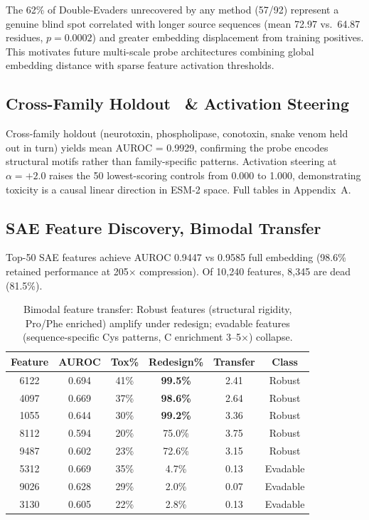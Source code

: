 \documentclass[11pt,a4paper]{article}
\begin{document}
The 62\% of Double-Evaders unrecovered by any method (57/92) represent a genuine blind spot correlated with longer source sequences (mean 72.97 vs.\ 64.87 residues, $p=0.0002$) and greater embedding displacement from training positives. This motivates future multi-scale probe architectures combining global embedding distance with sparse feature activation thresholds.

\subsection{Cross-Family Holdout \ \& Activation Steering}

Cross-family holdout (neurotoxin, phospholipase, conotoxin, snake venom held out in turn) yields mean AUROC = 0.9929, confirming the probe encodes structural motifs rather than family-specific patterns. Activation steering at $\alpha = +2.0$ raises the 50 lowest-scoring controls from 0.000 to 1.000, demonstrating toxicity is a causal linear direction in ESM-2 space. Full tables in Appendix~A.

\subsection{SAE Feature Discovery,  Bimodal Transfer}

Top-50 SAE features achieve AUROC 0.9447 vs 0.9585 full embedding (98.6\% retained performance at 205$\times$ compression). Of 10,240 features, 8,345 are dead (81.5\%).

\begin{table}[H]
\centering
\begin{tabular}{cccccc}
\toprule
\textbf{Feature} & \textbf{AUROC} & \textbf{Tox\%} & \textbf{Redesign\%} & \textbf{Transfer} & \textbf{Class} \\
\midrule
6122 & 0.694 & 41\% & \textbf{99.5\%} & 2.41 & Robust \\
4097 & 0.669 & 37\% & \textbf{98.6\%} & 2.64 & Robust \\
1055 & 0.644 & 30\% & \textbf{99.2\%} & 3.36 & Robust \\
8112 & 0.594 & 20\% & 75.0\% & 3.75 & Robust \\
9487 & 0.602 & 23\% & 72.6\% & 3.15 & Robust \\
5312 & 0.669 & 35\% & 4.7\% & 0.13 & Evadable \\
9026 & 0.628 & 29\% & 2.0\% & 0.07 & Evadable \\
3130 & 0.605 & 22\% & 2.8\% & 0.13 & Evadable \\
\bottomrule
\end{tabular}
\caption{Bimodal feature transfer: Robust features (structural rigidity, Pro/Phe enriched) amplify under redesign; evadable features (sequence-specific Cys patterns, C enrichment 3--5$\times$) collapse.}
\end{table}
\end{document}
